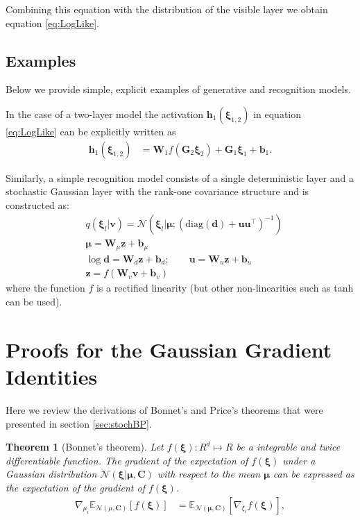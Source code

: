 \documentclass{article}
\newcommand{\E}{\mathbb{E}} %
\newcommand{\hid}{\ensuremath{\mathbf{h}}} %
\newcommand{\vis}{\ensuremath{\mathbf{v}}} %
\newcommand{\N}{\mathcal{N}} %
\newcommand{\myvec}[1]{\mbox{$\mathbf{#1}$}}
\newcommand{\myvecsym}[1]{\mbox{$\boldsymbol{#1}$}}
\newcommand{\vmu}{\mbox{$\myvecsym{\mu}$}}
\newcommand{\vxi}{\mbox{$\myvecsym{\xi}$}}
\newcommand{\vb}{\mbox{$\myvec{b}$}}
\newcommand{\vd}{\mbox{$\myvec{d}$}}
\newcommand{\vu}{\mbox{$\myvec{u}$}}
\newcommand{\vv}{\mbox{$\myvec{v}$}}
\newcommand{\vz}{\mbox{$\myvec{z}$}}
\newcommand{\vC}{\mbox{$\myvec{C}$}}
\newcommand{\vG}{\mbox{$\myvec{G}$}}
\newcommand{\vW}{\mbox{$\myvec{W}$}}
\newtheorem{theorem}{Theorem}[section]
\begin{document}
\begin{bibunit}[icml2013]
Combining this equation with the distribution of the visible layer we obtain 
equation \eqref{eq:LogLike}. 

\subsection{Examples}

Below we provide simple, explicit examples of generative and recognition 
models.

In the case of a two-layer model the activation $\hid_1(\vxi_{1,2})$ in 
equation \eqref{eq:LogLike} can be 
explicitly written as
\begin{eqnarray}
\hid_1(\vxi_{1,2}) & = \vW_1 f ( \vG_2 \vxi_2 ) + \vG_1 \vxi_1 + 
\vb_1.
\end{eqnarray}

Similarly, a simple recognition model consists of a single 
deterministic layer and a stochastic Gaussian layer with the rank-one 
covariance structure and is constructed as:
\begin{eqnarray}
& q(\vxi_l | \vis) = \N\left(\vxi_l | \vmu; (\textrm{diag}(\vd) +  \vu \vu^\top)^{-1}\right) \\
& \vmu = \vW_\mu \vz + \vb_\mu \\
& \log \vd =  \vW_d \vz + \vb_d  ; \qquad
\vu = \vW_u \vz + \vb_u \\
&\vz = f(\vW_v \vv + \vb_v)
\end{eqnarray}
where the function $f$ is a rectified linearity (but other non-linearities 
such as tanh can be used).


\section{Proofs for the Gaussian Gradient Identities}
\label{app:gaussDerivProofs}

Here we review the derivations of Bonnet's and Price's theorems that were presented in section \ref{sec:stochBP}.

\begin{theorem}[Bonnet's theorem]
Let $f(\vxi):  R^d  \mapsto R$ be a integrable and twice differentiable 
function. The gradient of the expectation of $f(\vxi)$ under a Gaussian 
distribution $\mathcal{N}(\vxi| \vmu,\vC)$ with respect to the mean $\vmu$ 
can be expressed as the 
expectation of the gradient of $f(\vxi)$.
\begin{align}
\nabla_{\mu_i} \E_{ \N(\mu,\vC) } \left[ f(\vxi) \right ] &= \E_{ \N(\vmu,\vC) } 
\left[
\nabla_{\xi_i} f(\vxi) \right],\nonumber
\end{align}
\end{theorem}


\end{bibunit}
\end{document}
